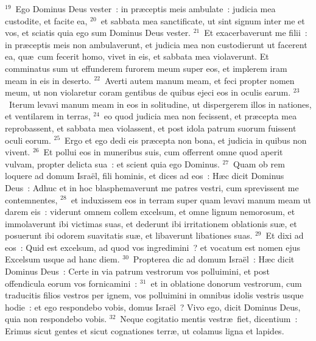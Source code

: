 ${}^{19}$~Ego Dominus Deus vester~: in pr\ae ceptis meis ambulate~: judicia mea custodite, et facite ea,
${}^{20}$~et sabbata mea sanctificate, ut sint signum inter me et vos, et sciatis quia ego sum Dominus Deus vester.
${}^{21}$~Et exacerbaverunt me filii~: in pr\ae ceptis meis non ambulaverunt, et judicia mea non custodierunt ut facerent ea, qu\ae\ cum fecerit homo, vivet in eis, et sabbata mea violaverunt. Et comminatus sum ut effunderem furorem meum super eos, et implerem iram meam in eis in deserto.
${}^{22}$~Averti autem manum meam, et feci propter nomen meum, ut non violaretur coram gentibus de quibus ejeci eos in oculis earum.
${}^{23}$~Iterum levavi manum meam in eos in solitudine, ut dispergerem illos in nationes, et ventilarem in terras,
${}^{24}$~eo quod judicia mea non fecissent, et pr\ae cepta mea reprobassent, et sabbata mea violassent, et post idola patrum suorum fuissent oculi eorum.
${}^{25}$~Ergo et ego dedi eis pr\ae cepta non bona, et judicia in quibus non vivent.
${}^{26}$~Et pollui eos in muneribus suis, cum offerrent omne quod aperit vulvam, propter delicta sua~: et scient quia ego Dominus.
${}^{27}$~Quam ob rem loquere ad domum Isra\"el, fili hominis, et dices ad eos~: H\ae c dicit Dominus Deus~: Adhuc et in hoc blasphemaverunt me patres vestri, cum sprevissent me contemnentes,
${}^{28}$~et induxissem eos in terram super quam levavi manum meam ut darem eis~: viderunt omnem collem excelsum, et omne lignum nemorosum, et immolaverunt ibi victimas suas, et dederunt ibi irritationem oblationis su\ae , et posuerunt ibi odorem suavitatis su\ae , et libaverunt libationes suas.
${}^{29}$~Et dixi ad eos~: Quid est excelsum, ad quod vos ingredimini~? et vocatum est nomen ejus Excelsum usque ad hanc diem.
${}^{30}$~Propterea dic ad domum Isra\"el~: H\ae c dicit Dominus Deus~: Certe in via patrum vestrorum vos polluimini, et post offendicula eorum vos fornicamini~:
${}^{31}$~et in oblatione donorum vestrorum, cum traducitis filios vestros per ignem, vos polluimini in omnibus idolis vestris usque hodie~: et ego respondebo vobis, domus Isra\"el~? Vivo ego, dicit Dominus Deus, quia non respondebo vobis.
${}^{32}$~Neque cogitatio mentis vestr\ae\ fiet, dicentium~: Erimus sicut gentes et sicut cognationes terr\ae , ut colamus ligna et lapides.


